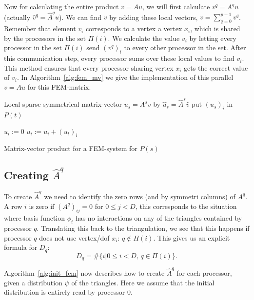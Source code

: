 \documentclass[11pt]{amsart}
\theoremstyle{definition}
\begin{document}
Now for calculating the entire product $v = Au$, we will first calculate $v^q = A^q u$ (actually $\hat v^q = \hat A^q \hat u$). We can find $v$ by adding these local vectors, $v = \sum_{q =0}^{p-1} v^q$. Remember that element $v_i$ corresponds to a vertex a vertex $x_i$, which is shared by the processors in the set $\Pi(i)$. We calculate the value $v_i$ by letting every processor in the set $\Pi(i)$ send $(v^q)_i$ to every other processor in the set. After this communication step, every processor sums over these local values to find $v_i$. This method ensures that every processor sharing vertex $x_i$ gets the correct value of $v_i$. In Algorithm~\ref{alg:fem_mv} we give the implementation of this parallel $v = Au$ for this FEM-matrix.


\begin{algorithm}[H]
	Local sparse symmetrical matrix-vector $u_s = A^s v$ by $\hat u_s = \hat A^s \hat v$\;
	 {
		 {
			put $(u_s)_i$ in $P(t)$\;
		}
	}
  
	 {
		$u_i := 0$\;
		 {
			$u_i := u_i + (u_t)_i$\;
		}
	}
 \caption{Matrix-vector product for a FEM-system for $P(s)$}
 \label{alg:fem_mv}
\end{algorithm}

\subsection{Creating $\hat A^q$}
To create $\hat A^q$ we need to identify the zero rows (and by symmetri columns) of $A^q$. A row $i$ is zero if $(A^q)_{ij} = 0$ for $0 \leq j < D$, this corresponds to the situation where basis function $\phi_i$ has no interactions on any of the triangles contained by processor $q$.  Translating this back to the triangulation, we see that this happens if processor $q$ does not use vertex/dof $x_i$: $q \not \in \Pi(i)$. This gives us an explicit formula for $D_q$:
\[
	D_q = \#\{ i | 0 \leq i < D,\, q \in \Pi(i)\}.
\]

Algorithm~\ref{alg:init_fem} now describes how to create $\hat A^q$ for each processor, given a distribution $\psi$ of the triangles. Here  we assume that the initial distribution is entirely read by processor $0$.
\end{document}
